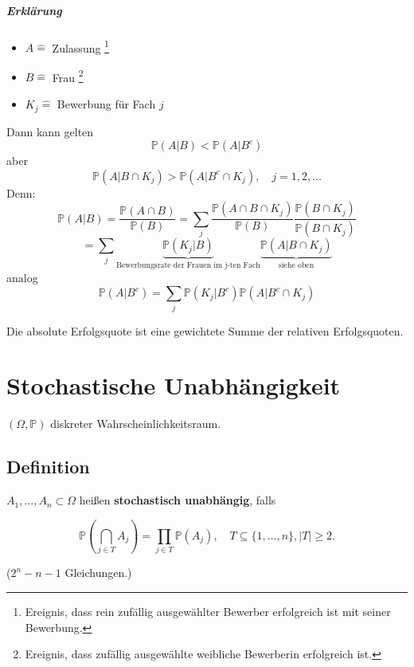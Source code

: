 \documentclass[a4paper,11pt,notitlepage]{report}
\newcommand{\Prim}{{\ensuremath{\mathbb{P}}}}
\begin{document}
\paragraph{Erklärung}
\begin{itemize}
	\item $A \hat{=}$ Zulassung \footnote{Ereignis, dass rein zufällig ausgewählter Bewerber erfolgreich ist mit seiner Bewerbung.}
	\item $B \hat{=}$ Frau \footnote{Ereignis, dass zufällig ausgewählte weibliche Bewerberin erfolgreich ist.}
	\item $K_j \hat{=}$ Bewerbung für Fach $j$
\end{itemize}

Dann kann gelten
$$\Prim(A|B) < \Prim(A | B^c)$$
aber
$$\Prim(A|B \cap K_j) > \Prim(A|B^c \cap K_j), \quad j=1,2,\ldots$$
Denn:
$$\Prim(A|B)= \frac{\Prim(A\cap B)}{\Prim(B)} = \sum\limits_{j}{\frac{\Prim(A \cap B\cap K_j)}{\Prim(B)} \frac{\Prim(B \cap K_j)}{\Prim(B \cap K_j)}}$$
$$ = \sum\limits_{j}{\underbrace{\Prim(K_j|B)}_{\text{Bewerbungsrate der Frauen im j-ten Fach}}\underbrace{\Prim(A|B \cap K_j)}_{\text{siehe oben}}}$$
analog
$$\Prim(A|B^c) = \sum\limits_{j}{\Prim(K_j|B^c) \Prim(A|B^c \cap K_j)}$$

Die absolute Erfolgsquote ist eine gewichtete Summe der relativen Erfolgsquoten.

\chapter{Stochastische Unabhängigkeit}
$(\Omega, \Prim)$ diskreter Wahrscheinlichkeitsraum.

\section{Definition}
$A_1, \ldots, A_n \subset \Omega$ heißen \textbf{stochastisch unabhängig}, falls

$$\Prim(\bigcap\limits_{j \in T}{A_j}) = \prod\limits_{j \in T}{\Prim(A_j)}, \quad T \subseteq \{1, \ldots, n\}, |T| \geq 2.$$

($2^n - n - 1$ Gleichungen.)
\end{document}
